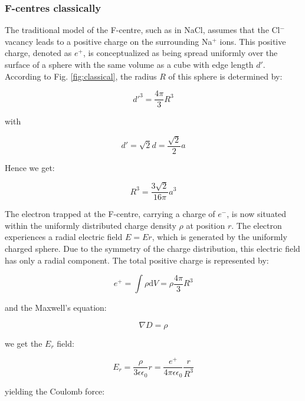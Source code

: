 \documentclass{article}
\begin{document}
\pagebreak{}

\subsubsection{F-centres classically}
The traditional model of the F-centre, such as in NaCl, assumes that the Cl$^-$  vacancy leads to a positive charge on the surrounding Na$^+$ ions. This positive charge, denoted as $e^+$, is conceptualized as being spread uniformly over the surface of a sphere with the same volume as a cube with edge length $d'$. According to Fig. \ref{fig:classical}, the radius $R$ of this sphere is determined by:

\begin{equation*}
    d'^3 = \frac{4\pi}{3} R^3
\end{equation*}

with 

\begin{equation*}
    d' = \sqrt{2}d = \frac{\sqrt{2}}{2}a
\end{equation*}

Hence we get: 

\begin{equation*}
    R^3 = \frac{3\sqrt{2}}{16\pi}a^3
\end{equation*}

The electron trapped at the F-centre, carrying a charge of $e^-$, is now situated within the uniformly distributed charge density $\rho$ at position $r$. The electron experiences a radial electric field $E = Er$, which is generated by the uniformly charged sphere. Due to the symmetry of the charge distribution, this electric field has only a radial component. The total positive charge is represented by: 

\begin{equation*}
    e^{+}=\int \rho \mathrm{d} V=\rho \frac{4 \pi}{3} R^3
\end{equation*}

and the Maxwell's equation: 

\begin{equation*}
    \nabla D = \rho
\end{equation*}

we get the $E_r$ field: 

\begin{equation*}
    E_r = \frac{\rho}{3\epsilon \epsilon_0} r = \frac{e^+}{4\pi \epsilon \epsilon_0}\frac{r}{R^3}
\end{equation*}

yielding the Coulomb force: 
\end{document}
